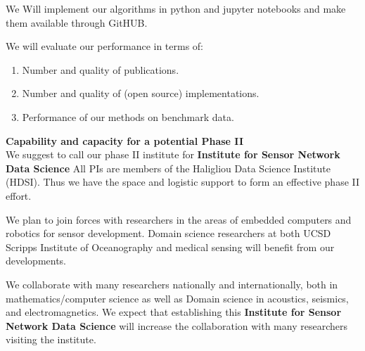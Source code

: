 \documentclass{article}
\begin{document}
We Will implement our algorithms in python and jupyter notebooks and
make them available through GitHUB.


We will evaluate our performance in terms of:
\begin{enumerate}
\item Number and quality of publications.
\item Number  and quality of (open source) implementations.
\item Performance of our methods on benchmark data.
\end{enumerate}

\vspace{1cm}
{\bf Capability and capacity for a potential Phase II}\\
We suggest to call our phase II institute for {\bf Institute for  Sensor Network Data Science}
All PIs are members of the Haligliou Data Science Institute (HDSI). Thus we have the space and logistic support to form an effective phase II effort.

We plan to join forces with researchers in the areas of embedded
computers and  robotics for sensor development. Domain science researchers  at both UCSD Scripps Institute of Oceanography and medical sensing will benefit from our developments.

We collaborate with many researchers nationally and  internationally, both in mathematics/computer science as well as Domain science in acoustics, seismics, and electromagnetics. We expect that establishing this {\bf Institute for  Sensor Network Data Science} will increase the collaboration with many researchers visiting the institute.

\vspace{1cm}


    
\end{document}
